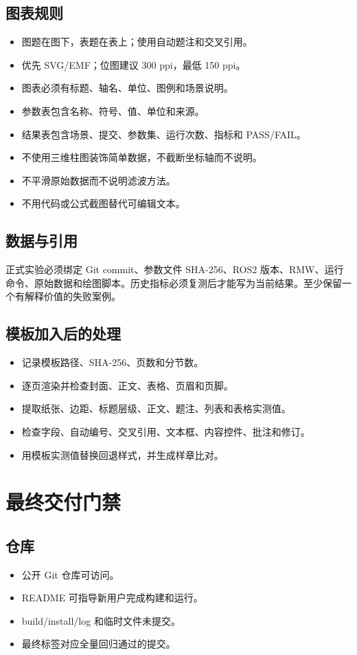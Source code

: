 \documentclass[UTF8,a4paper,12pt,fontset=fandol]{ctexart}
\newcommand{\unchecked}{\(\square\)}
\newcommand{\workitem}[1]{\item[\unchecked] #1}
\begin{document}
\subsection{图表规则}

\begin{itemize}
  \item 图题在图下，表题在表上；使用自动题注和交叉引用。
  \item 优先 SVG/EMF；位图建议 300 ppi，最低 150 ppi。
  \item 图表必须有标题、轴名、单位、图例和场景说明。
  \item 参数表包含名称、符号、值、单位和来源。
  \item 结果表包含场景、提交、参数集、运行次数、指标和 PASS/FAIL。
  \item 不使用三维柱图装饰简单数据，不截断坐标轴而不说明。
  \item 不平滑原始数据而不说明滤波方法。
  \item 不用代码或公式截图替代可编辑文本。
\end{itemize}

\subsection{数据与引用}

正式实验必须绑定 Git commit、参数文件 SHA-256、ROS2 版本、RMW、运行命令、原始数据和绘图脚本。历史指标必须复测后才能写为当前结果。至少保留一个有解释价值的失败案例。

\subsection{模板加入后的处理}

\begin{itemize}
  \workitem{记录模板路径、SHA-256、页数和分节数。}
  \workitem{逐页渲染并检查封面、正文、表格、页眉和页脚。}
  \workitem{提取纸张、边距、标题层级、正文、题注、列表和表格实测值。}
  \workitem{检查字段、自动编号、交叉引用、文本框、内容控件、批注和修订。}
  \workitem{用模板实测值替换回退样式，并生成样章比对。}
\end{itemize}

\section{最终交付门禁}

\subsection{仓库}
\begin{itemize}
  \workitem{公开 Git 仓库可访问。}
  \workitem{README 可指导新用户完成构建和运行。}
  \workitem{build/install/log 和临时文件未提交。}
  \workitem{最终标签对应全量回归通过的提交。}
\end{itemize}
\end{document}
